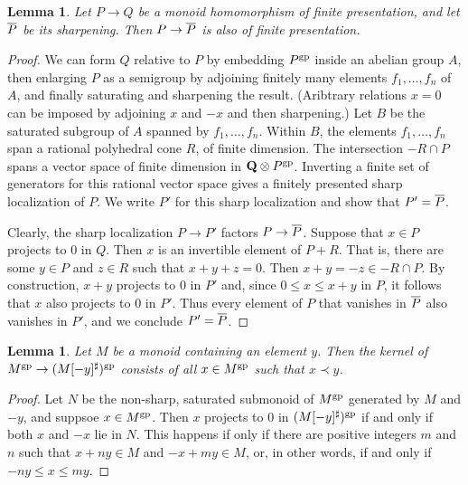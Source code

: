 \documentclass[10pt]{article}
\numberwithin{equation}{section}
\newtheorem{lemma}[paragraph]{Lemma}
\theoremstyle{definition}
\theoremstyle{remark}
\newcommand{\gp}[1]{#1^{\rm gp}}
\renewcommand{\bar}[1]{\overnorm{#1}\vphantom{#1}}
\def\overnorm#1{\overline{#1}\vphantom{#1}}
\begin{document}
\begin{lemma} \label{lem:12}
	Let $P \to Q$ be a monoid homomorphism of finite presentation, and let $\bar P$ be its sharpening.  Then $P \to \bar P$ is also of finite presentation.
\end{lemma}
\begin{proof}
	We can form $Q$ relative to $P$ by embedding $\gp P$ inside an abelian group $A$, then enlarging $P$ as a semigroup by adjoining finitely many elements $f_1, \ldots, f_n$ of $A$, and finally saturating and sharpening the result.  (Aribtrary relations $x = 0$ can be imposed by adjoining $x$ and $-x$ and then sharpening.)  Let $B$ be the saturated subgroup of $A$ spanned by $f_1, \ldots, f_n$.  Within $B$, the elements $f_1, \ldots, f_n$ span a rational polyhedral cone $R$, of finite dimension.  The intersection $-R \cap P$ spans a vector space of finite dimension in $\mathbf Q \otimes \gp P$.  Inverting a finite set of generators for this rational vector space gives a finitely presented sharp localization of $P$.  We write $P'$ for this sharp localization and show that $P' = \bar P$.

	Clearly, the sharp localization $P \to P'$ factors $P \to \bar P$.  Suppose that $x \in P$ projects to $0$ in $Q$.  Then $x$ is an invertible element of $P + R$.  That is, there are some $y \in P$ and $z \in R$ such that $x + y + z = 0$.  Then $x + y = - z \in -R \cap P$.  By construction, $x + y$ projects to $0$ in $P'$ and, since $0 \leq x \leq x + y$ in $P$, it follows that $x$ also projects to $0$ in $P'$.  Thus every element of $P$ that vanishes in $\bar P$ also vanishes in $P'$, and we conclude $P' = \bar P$.
\end{proof}



\begin{lemma} \label{lem:9}
	Let $M$ be a monoid containing an element $y$.  Then the kernel of $\gp M \to (M[-y]^{\sharp})^{\rm gp}$ consists of all $x \in \gp M$ such that $x \prec y$.
\end{lemma}
\begin{proof}
	Let $N$ be the non-sharp, saturated submonoid of $\gp M$ generated by $M$ and $-y$, and suppsoe $x \in \gp M$.  Then $x$ projects to $0$ in $(M[-y]^{\sharp})^{\rm gp}$ if and only if both $x$ and $-x$ lie in $N$.  This happens if only if there are positive integers $m$ and $n$ such that $x + ny \in M$ and $-x + my \in M$, or, in other words, if and only if $-ny \leq x \leq my$. 
\end{proof}
\end{document}
